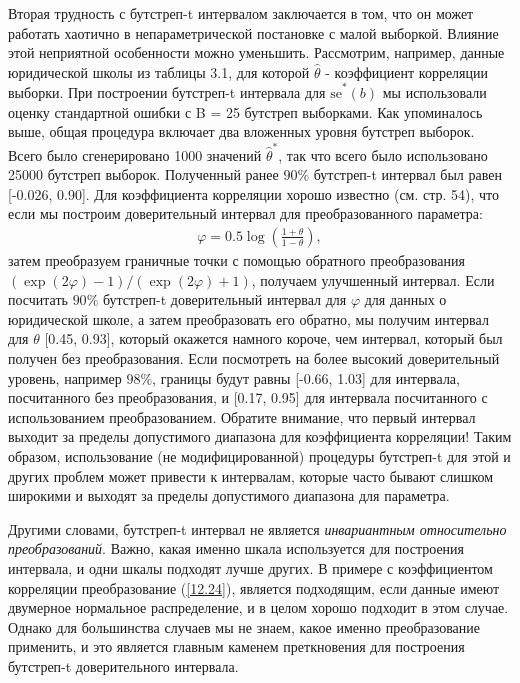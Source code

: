 Вторая трудность с бутстреп-t интервалом заключается в том, что он может работать хаотично в непараметрической постановке с малой выборкой. Влияние этой неприятной особенности можно уменьшить. Рассмотрим, например, данные юридической школы из таблицы 3.1, для которой  $\widehat{\theta}$ - коэффициент корреляции выборки. При построении бутстреп-t интервала для $\widehat{\text{se}}^{*}(b)$ мы использовали оценку стандартной ошибки с B = 25 бутстреп выборками. Как упоминалось выше, общая процедура включает два вложенных уровня бутстреп выборок. Всего было сгенерировано 1000 значений  $\widehat{\theta}^{*}$, так что всего было использовано 25000 бутстреп выборок. Полученный ранее $90 \%$ бутстреп-t интервал был равен [-0.026, 0.90]. Для коэффициента корреляции хорошо известно (см. стр. 54), что если мы построим доверительный интервал для преобразованного параметра:
\begin{gather}\label{12.24}
\varphi = 0.5 \log(\frac{1+\theta}{1 - \theta}),
\end{gather}
затем преобразуем граничные точки с помощью обратного преобразования $(\exp(2\varphi) - 1)/(\exp(2\varphi) + 1)$, получаем улучшенный интервал. Если посчитать $90\%$ бутстреп-t доверительный интервал для $\varphi$ для данных о юридической школе, а затем преобразовать его обратно, мы получим интервал для $\theta$ [0.45, 0.93], который окажется намного короче, чем интервал, который был получен без преобразования. Если посмотреть на более высокий доверительный уровень, например $ 98\% $, границы будут равны [-0.66, 1.03] для интервала, посчитанного без преобразования, и [0.17, 0.95] для интервала посчитанного с использованием преобразованием. Обратите внимание, что первый интервал выходит за пределы допустимого диапазона для коэффициента корреляции! Таким образом, использование (не модифицированной) процедуры бутстреп-t для этой и других проблем может привести к интервалам, которые часто бывают слишком широкими и выходят за пределы допустимого диапазона для параметра. 

Другими словами, бутстреп-t интервал не является \textit{инвариантным относительно преобразований}. Важно, какая именно шкала используется для построения интервала, и одни шкалы подходят лучше других. В примере с коэффициентом корреляции преобразование (\ref{12.24}), является подходящим, если данные имеют двумерное нормальное распределение, и в целом хорошо подходит в этом случае. Однако для большинства случаев мы не знаем, какое именно преобразование применить, и это является главным каменем преткновения для построения бутстреп-t доверительного интервала.

